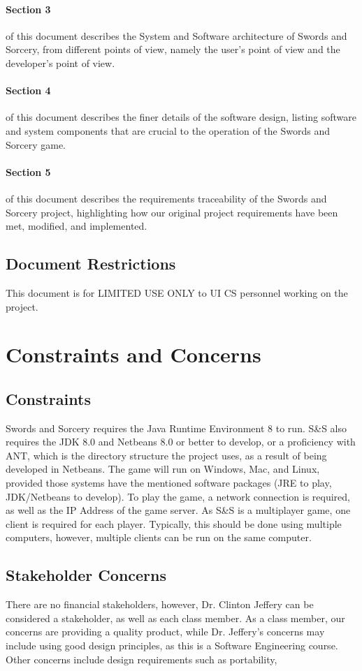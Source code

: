 \documentclass[12pt,a4paper,titlepage]{article}
\begin{document}
\paragraph{Section 3} of this document describes the System and Software architecture of Swords and Sorcery, from different points of view, namely the user's point of view and the developer's point of view.
\paragraph{Section 4} of this document describes the finer details of the software design, listing software and system components that are crucial to the operation of the Swords and Sorcery game. 
\paragraph{Section 5} of this document describes the requirements traceability of the Swords and Sorcery project, highlighting how our original project requirements have been met, modified, and implemented.
\subsection{Document Restrictions}
This document is for LIMITED USE ONLY to UI CS personnel working on the project.
\section{Constraints and Concerns}

\subsection{Constraints}
Swords and Sorcery requires the Java Runtime Environment 8 to run. S\&S also requires the JDK 8.0 and Netbeans 8.0 or better to develop, or a proficiency with ANT, which is the directory structure the project uses, as a result of being developed in Netbeans. The game will run on Windows, Mac, and Linux, provided those systems have the mentioned software packages (JRE to play, JDK/Netbeans to develop). To play the game, a network connection is required, as well as the IP Address of the game server. As S\&S is a multiplayer game, one client is required for each player. Typically, this should be done using multiple computers, however, multiple clients can be run on the same computer.

\subsection{Stakeholder Concerns}
There are no financial stakeholders, however, Dr. Clinton Jeffery can be considered a stakeholder, as well as each class member. As a class member, our concerns are providing a quality product, while Dr. Jeffery's concerns may include using good design principles, as this is a Software Engineering course. 
Other concerns include design requirements such as portability, 
\end{document}
